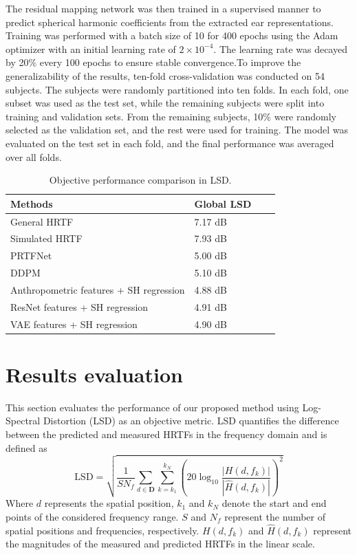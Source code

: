 \documentclass[a4paper,fleqn]{cas-dc}
\begin{document}
The residual mapping network was then trained in a supervised manner to predict spherical harmonic coefficients from the extracted ear representations. Training was performed with a batch size of 10 for 400 epochs using the Adam optimizer with an initial learning rate of $2\times 10^{-4}$. The learning rate was decayed by 20\% every 100 epochs to ensure stable convergence.To improve the generalizability of the results, ten-fold cross-validation was conducted on 54 subjects. The subjects were randomly partitioned into ten folds. In each fold, one subset was used as the test set, while the remaining subjects were split into training and validation sets. From the remaining subjects, 10\% were randomly selected as the validation set, and the rest were used for training. The model was evaluated on the test set in each fold, and the final performance was averaged over all folds.




\begin{table}[t]
\caption{Objective performance comparison in LSD.}
\label{table:result}
{%
\begin{tabular}{@{}lllc@{}}\toprule
Methods& Global LSD \\\midrule
General HRTF   & 7.17 dB\\
Simulated HRTF   & 7.93 dB\\
PRTFNet\cite{ko_prtfnet_2023}   & 5.00 dB\\
DDPM\cite{10887566} & 5.10 dB\\
Anthropometric features + SH regression & 4.88 dB \\
ResNet features + SH regression & 4.91 dB \\
VAE features + SH regression & 4.90 dB\\\bottomrule
\end{tabular}}
\end{table}
\section{Results evaluation}

This section evaluates the performance of our proposed method using Log-Spectral Distortion (LSD) as an objective metric. LSD quantifies the difference between the predicted and measured HRTFs in the frequency domain and is defined as
\begin{equation}
\mathrm{LSD}=\sqrt{\frac{1}{S N_{f}} \sum_{d \in \mathbf{D}} \sum_{k=k_{1}}^{k_{N}}\left(20 \log _{10} \frac{\left|H\left(d, f_{k}\right)\right|}{\left|\hat{H}\left(d, f_{k}\right)\right|}\right)^{2}}
\end{equation}
Where $ d $ represents the spatial position, $ k_{1} $ and $ k_{N} $ denote the start and end points of the considered frequency range. $ S $ and $ N_{f} $ represent the number of spatial positions and frequencies, respectively. $ H\left(d, f_{k}\right) $ and $ \hat{H}\left(d, f_{k}\right) $ represent the magnitudes of the measured and predicted HRTFs in the linear scale.
\end{document}
